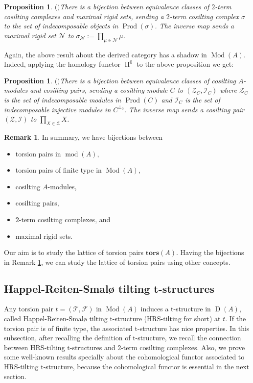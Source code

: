 \documentclass[12pt]{amsart}
\numberwithin{equation}{section}
\newtheorem{proposition}[lemma]{Proposition}
\theoremstyle{definition}
\newtheorem{remark}[lemma]{Remark}
\DeclareMathOperator{\Mod}{Mod}
\DeclareMathOperator{\modd}{mod}
\DeclareMathOperator{\D}{D}
\DeclareMathOperator{\HH}{H}
\DeclareMathOperator{\Prod}{Prod}
\newtheorem*{theorem 0*}{Theorem}
\newtheorem*{theorem a*}{Theorem A}
\newtheorem*{theorem b*}{Theorem B}
\numberwithin{diagram}{section}
\begin{document}
\begin{proposition}$($\cite{ALS1}$)$\label{2.11}
There is a bijection between equivalence classes of $2$-term cosilting complexes and maximal rigid sets, sending a $2$-term cosilting complex $\sigma$ to the set of indecomposable objects in $\Prod(\sigma)$. The inverse map sends a maximal rigid set $\mathcal{N}$ to $\sigma_{\mathcal{N}}:=\prod_{\mu\in\mathcal{N}}\mu$.
\end{proposition}
Again, the above result about the derived category has a shadow in $\Mod(A)$. Indeed, applying the homology functor $\HH^0$ to the above proposition we get:
\begin{proposition}$($\cite{ALS1}$)$\label{2.12}
There is a bijection between equivalence classes of cosilting $A$-modules and cosilting pairs, sending a cosilting module $C$ to $(\mathcal{Z}_C,\mathcal{I}_C)$ where $\mathcal{Z}_C$ is the set of indecomposable modules in $\Prod(C)$ and $\mathcal{I}_C$ is the set of indecomposable injective modules in $C^{\bot_0}$. The inverse map sends a cosilting pair $(\mathcal{Z},\mathcal{I})$ to $\prod_{X\in\mathcal{Z}}X$.
	\end{proposition}
\begin{remark}\label{2.13}
In summary, we have bijections between
\begin{itemize}
\item torsion pairs in $\modd(A)$,
\item torsion pairs of finite type in $\Mod(A)$,
\item cosilting $A$-modules,
\item cosilting pairs,
\item $2$-term cosilting complexes, and
\item maximal rigid sets.
\end{itemize}
\end{remark}
	
Our aim is to study the lattice of torsion pairs $\textbf{tors}(A)$. Having the bijections in Remark \ref{2.13}, we can study the lattice of torsion pairs using other concepts.
	
\subsection{Happel-Reiten-Smalø tilting t-structures}
Any torsion pair $t=(\mathcal{T},\mathcal{F})$ in $\Mod(A)$ induces a t-structure in $\D(A)$, called Happel-Reiten-Smalø tilting t-structure (HRS-tilting for short) at $t$. If the torsion pair is of finite type, the associated t-structure has nice properties. In this subsection, after recalling the definition of t-structure, we recall the connection between HRS-tilting t-structures and $2$-term cosilting complexes. Also, we prove some well-known results specially about the cohomological functor associated to HRS-tilting t-structure, because the cohomological functor is essential in the next section.
	
\end{document}

